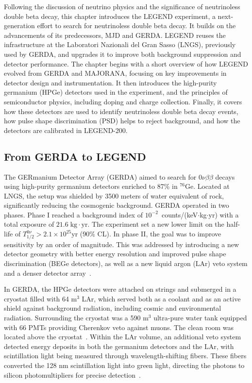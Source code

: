 
Following the discussion of neutrino physics and the significance of neutrinoless double beta decay, this chapter introduces the LEGEND experiment, a next-generation effort to search for neutrinoless double beta decay. It builds on the advancements of its predecessors, MJD and GERDA. LEGEND reuses the infrastructure at the Laboratori Nazionali del Gran Sasso (LNGS), previously used by GERDA, and upgrades it to improve both background suppression and detector performance. 
The chapter begins with a short overview of how LEGEND evolved from GERDA and MAJORANA, focusing on key improvements in detector design and instrumentation. It then introduces the high-purity germanium (HPGe) detectors used in the experiment, and the principles of semiconductor physics, including doping and charge collection. Finally, it covers how these detectors are used to identify neutrinoless double beta decay events, how pulse shape discrimination (PSD) helps to reject background, and how the detectors are calibrated in LEGEND-200. 

\subsection{From GERDA to LEGEND}

The GERmanium Detector Array (GERDA) aimed to search for $0 \nu \beta \beta$ decays using high-purity germanium detectors enriched to 87\% in $^{76}$Ge. Located at LNGS, the setup was shielded by 3500 meters of water equivalent of rock, significantly reducing the cosmogenic background.
GERDA operated in two phases. Phase I reached a background index of $10^{-2}$~counts/(keV$\cdot$kg$\cdot$yr) with a total exposure of $21.6 \; \mathrm{kg} \cdot \mathrm{yr}$. The experiment set a new lower limit on the half-life of $T^{0 \nu}_{1/2} > 2.1 \times 10^{25}$yr (90\% CL). 
In phase II, the goal was to improve sensitivity by an order of magnitude. This was addressed by introducing a new detector geometry with better energy resolution and improved pulse shape discrimination (BEGe detectors), as well as a new liquid argon (LAr) veto system and a denser detector array~\cite{agostini_upgrade_2018}. 

In GERDA, the HPGe detectors were attached on strings and submerged in a cryostat filled with 64 m$^3$ LAr, which served both as a coolant and as an active shield against background radiation, including cosmic and environmental radiation. Surrounding the cryostat was a 590 m$^3$ ultra-pure water tank equipped with 66 PMTs providing Cherenkov veto against muons. The clean room was located above the cryostat~\cite{agostini_upgrade_2018}. 
Within the LAr volume, an additional veto system detected energy deposits in both the germanium detectors and the LAr, with scintillation light being measured through wavelength-shifting fibers. These fibers converted the 128 nm scintillation light into green light, directing the photons to silicon photomultipliers for precise detection~\cite{agostini_upgrade_2018}.  

